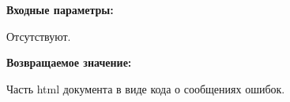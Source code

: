 \textbf{Входные параметры:}

Отсутствуют.

\textbf{Возвращаемое значение:}

Часть html документа в виде кода о сообщениях ошибок.